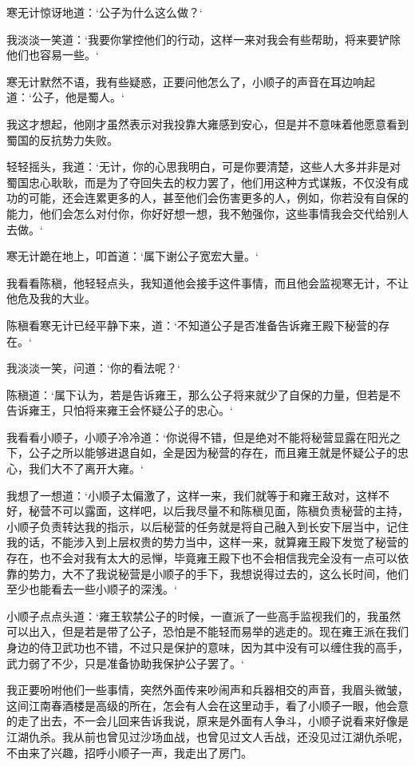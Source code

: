 寒无计惊讶地道：‘公子为什么这么做？‘

我淡淡一笑道：‘我要你掌控他们的行动，这样一来对我会有些帮助，将来要铲除他们也容易一些。‘

寒无计默然不语，我有些疑惑，正要问他怎么了，小顺子的声音在耳边响起道：‘公子，他是蜀人。‘

我这才想起，他刚才虽然表示对我投靠大雍感到安心，但是并不意味着他愿意看到蜀国的反抗势力失败。

轻轻摇头，我道：‘无计，你的心思我明白，可是你要清楚，这些人大多并非是对蜀国忠心耿耿，而是为了夺回失去的权力罢了，他们用这种方式谋叛，不仅没有成功的可能，还会连累更多的人，甚至他们会伤害更多的人，例如，你若没有自保的能力，他们会怎么对付你，你好好想一想，我不勉强你，这些事情我会交代给别人去做。‘

寒无计跪在地上，叩首道：‘属下谢公子宽宏大量。‘

我看看陈稹，他轻轻点头，我知道他会接手这件事情，而且他会监视寒无计，不让他危及我的大业。

陈稹看寒无计已经平静下来，道：‘不知道公子是否准备告诉雍王殿下秘营的存在。‘

我淡淡一笑，问道：‘你的看法呢？‘

陈稹道：‘属下认为，若是告诉雍王，那么公子将来就少了自保的力量，但若是不告诉雍王，只怕将来雍王会怀疑公子的忠心。‘

我看看小顺子，小顺子冷冷道：‘你说得不错，但是绝对不能将秘营显露在阳光之下，公子之所以能够进退自如，全是因为秘营的存在，而且雍王就是怀疑公子的忠心，我们大不了离开大雍。‘

我想了一想道：‘小顺子太偏激了，这样一来，我们就等于和雍王敌对，这样不好，秘营不可以露面，这样吧，以后我尽量不和陈稹见面，陈稹负责秘营的主持，小顺子负责转达我的指示，以后秘营的任务就是将自己融入到长安下层当中，记住我的话，不能涉入到上层权贵的势力当中，这样一来，就算雍王殿下发觉了秘营的存在，也不会对我有太大的忌惮，毕竟雍王殿下也不会相信我完全没有一点可以依靠的势力，大不了我说秘营是小顺子的手下，我想说得过去的，这么长时间，他们至少也能看去一些小顺子的深浅。‘

小顺子点点头道：‘雍王软禁公子的时候，一直派了一些高手监视我们的，我虽然可以出入，但是若是带了公子，恐怕是不能轻而易举的逃走的。现在雍王派在我们身边的侍卫武功也不错，不过只是保护的意味，因为其中没有可以缠住我的高手，武力弱了不少，只是准备协助我保护公子罢了。‘

我正要吩咐他们一些事情，突然外面传来吵闹声和兵器相交的声音，我眉头微皱，这间江南春酒楼是高级的所在，怎会有人会在这里动手，看了小顺子一眼，他会意的走了出去，不一会儿回来告诉我说，原来是外面有人争斗，小顺子说看来好像是江湖仇杀。我从前也曾见过沙场血战，也曾见过文人舌战，还没见过江湖仇杀呢，不由来了兴趣，招呼小顺子一声，我走出了房门。

